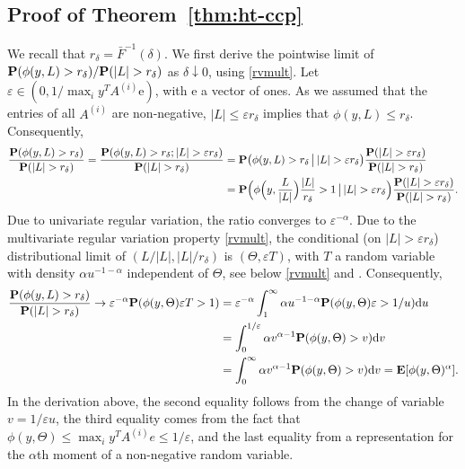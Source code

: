 \documentclass[a4paper, a4wide, 10pt, reqno]{amsart}
\theoremstyle{plain}
\newcommand{\rd}{\mathrm{d}}
\begin{document}
\subsection{Proof of Theorem~\ref{thm:ht-ccp}}\label{sec-proof4}
We recall that $r_\delta=\bar F^{-1}(\delta)$.
We first derive the pointwise limit of 
${\bf P}(\phi(y,L) > r_\delta)/{\bf P}(|L| > r_\delta)$
as $\delta\downarrow 0$,  using \eqref{rvmult}.
Let $\varepsilon \in (0, 1/\max_i y^T A^{(i)} \mathrm{e})$, with $\mathrm{e}$ a vector of ones. 
As we assumed that the entries of all $A^{(i)}$ are non-negative,  $|L| \leq \varepsilon r_\delta$ implies that $\phi(y,L) \leq r_\delta$. Consequently, 
\begin{align}
    \frac{{\bf P}(\phi(y,L) > r_\delta)}{{\bf P}(|L| > r_\delta)} = \frac{{\bf P}(\phi(y,L) > r_\delta ; |L| > \varepsilon r_\delta)}{{\bf P}(|L| > r_\delta)}\label{eq:pareto-1}&= 
     {\bf P}\big(\phi(y,L) > r_\delta \,\big|\, |L| > \varepsilon r_\delta\big)     
\frac{{\bf P}(|L| > \varepsilon r_\delta)} {{\bf P}(|L| > r_\delta)}\\
  &= 
     {\bf P}\Big(\phi\Big(y,\frac{L}{|L|}\Big) \frac{|L|}{r_\delta} >1 \,\big|\, |L| > \varepsilon r_\delta\Big)     
\frac{{\bf P}(|L| > \varepsilon r_\delta)} {{\bf P}(|L| > r_\delta)}.\label{eq:pareto-3}
\end{align}
Due to univariate regular variation, the ratio converges to 
$\varepsilon^{-\alpha}$. Due to the multivariate regular variation property \eqref{rvmult}, the conditional (on $ |L| > \varepsilon r_\delta$) distributional limit of $(L/|L|, |L|/r_\delta)$ 
is $(\Theta, \varepsilon T)$, with $T$ a random variable with density $\alpha u^{-1-\alpha}$ independent of $\Theta$, see below \eqref{rvmult} and \cite{basrak2002characterization}.
Consequently, 
\begin{align}
 \frac{{\bf P}(\phi(y,L) > r_\delta)}{{\bf P}(|L| > r_\delta)} \rightarrow \varepsilon ^{-\alpha}   
 {\bf P}(\phi(y,\Theta) \varepsilon T >1) 
 &= \varepsilon ^{-\alpha} \int_1^\infty \alpha u^{-1-\alpha} 
  {\bf P}(\phi(y,\Theta) \varepsilon  >1/u)\rd u\\
  &= \int_0^{1/\varepsilon} \alpha v^{\alpha-1} 
  {\bf P}(\phi(y,\Theta)  >v)\rd v\\
  &= \int_0^{\infty} \alpha v^{\alpha-1} 
  {\bf P}(\phi(y,\Theta)  >v)\rd v= {\bf E} [ \phi(y,\Theta)^\alpha].\label{eq:pareto-2}
\end{align}
In the derivation above, the second equality follows from
the change of variable $v=1/\varepsilon u$, the third equality comes from the fact that 
$\phi(y,\Theta) \leq \max_i y^T A^{(i)} e \leq 1/\varepsilon$, and the last equality from a representation for the $\alpha$th moment of a non-negative random variable. 
\end{document}
